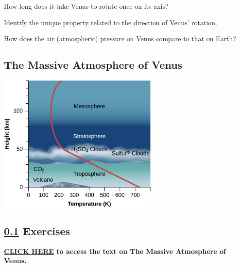 \documentclass{article}
\numberwithin{equation}{section}
\numberwithin{figure}{section}
\begin{document}
\begin{exercise}
    How long does it take Venus to rotate once on its axis?
\end{exercise}

\begin{exercise}
    Identify the unique property related to the direction of Venus' rotation.
\end{exercise}

\begin{exercise}
    How does the air (atmospheric) pressure on Venus compare to that on Earth?
\end{exercise}

\clearpage

\subsection{The Massive Atmosphere of Venus} \label{L8rXjS}

\begin{center}
    \includegraphics[width=8cm]{Figures/Figure10.12.jpeg}
    \captionsetup{type=figure,margin=1in,font=scriptsize}
\end{center}

\subsection*{\ref{L8rXjS} Exercises}

\textbf{\href{https://openstax.org/books/astronomy-2e/pages/10-3-the-massive-atmosphere-of-venus}{CLICK HERE} to access the text on The Massive Atmosphere of Venus.} 
\end{document}
